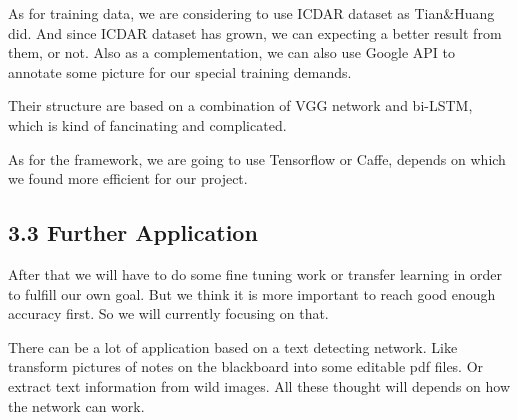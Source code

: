 \documentclass[]{article}
\begin{document}
As for training data, we are considering to use ICDAR dataset as Tian\&Huang did. And since ICDAR dataset has grown, we can expecting a better result from them, or not. Also as a complementation, we can also use Google API to annotate some picture for our special training demands.

Their structure are based on a combination of VGG network and bi-LSTM, which is kind of fancinating and complicated. 

As for the framework, we are going to use Tensorflow or Caffe, depends on which we found more efficient for our project.




\subsection{3.3 Further Application}

After that we will have to do some fine tuning work or transfer learning in order to fulfill our own goal. But we think it is more important to reach good enough accuracy first. So we will currently focusing on that.

There can be a lot of application based on a text detecting network. Like transform pictures of notes on the blackboard into some editable pdf files. Or extract text information from wild images. All these thought will depends on how the network can work.
\end{document}
